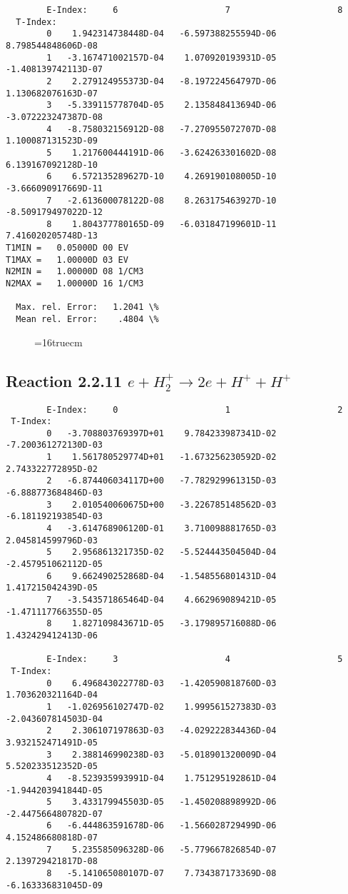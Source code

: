 \documentclass[12pt,dvipdfmx]{article}
\begin{document}
{\begin{small}
\begin{verbatim}
        E-Index:     6                     7                     8
  T-Index:
        0    1.942314738448D-04   -6.597388255594D-06    8.798544848606D-08
        1   -3.167471002157D-04    1.070920193931D-05   -1.408139742113D-07
        2    2.279124955373D-04   -8.197224564797D-06    1.130682076163D-07
        3   -5.339115778704D-05    2.135848413694D-06   -3.072223247387D-08
        4   -8.758032156912D-08   -7.270955072707D-08    1.100087131523D-09
        5    1.217600444191D-06   -3.624263301602D-08    6.139167092128D-10
        6    6.572135289627D-10    4.269190108005D-10   -3.666090917669D-11
        7   -2.613600078122D-08    8.263175463927D-10   -8.509179497022D-12
        8    1.804377780165D-09   -6.031847199601D-11    7.416020205748D-13
T1MIN =   0.05000D 00 EV
T1MAX =   1.00000D 03 EV
N2MIN =   1.00000D 08 1/CM3
N2MAX =   1.00000D 16 1/CM3

  Max. rel. Error:   1.2041 \%
  Mean rel. Error:    .4804 \%
\end{verbatim}\end{small}
\begin{figure} \label{2.2.10}
\epsfxsize=16truecm
\end{figure}
\newpage



\subsection{
Reaction 2.2.11   $e + H_2^+      \rightarrow 2e + H^+ + H^+ $
}


\begin{small}\begin{verbatim}
        E-Index:     0                     1                     2
 T-Index:
        0   -3.708803769397D+01    9.784233987341D-02   -7.200361272130D-03
        1    1.561780529774D+01   -1.673256230592D-02    2.743322772895D-02
        2   -6.874406034117D+00   -7.782929961315D-03   -6.888773684846D-03
        3    2.010540060675D+00   -3.226785148562D-03   -6.181192193854D-03
        4   -3.614768906120D-01    3.710098881765D-03    2.045814599796D-03
        5    2.956861321735D-02   -5.524443504504D-04   -2.457951062112D-05
        6    9.662490252868D-04   -1.548556801431D-04    1.417215042439D-05
        7   -3.543571865464D-04    4.662969089421D-05   -1.471117766355D-05
        8    1.827109843671D-05   -3.179895716088D-06    1.432429412413D-06

        E-Index:     3                     4                     5
 T-Index:
        0    6.496843022778D-03   -1.420590818760D-03    1.703620321164D-04
        1   -1.026956102747D-02    1.999561527383D-03   -2.043607814503D-04
        2    2.306107197863D-03   -4.029222834436D-04    3.932152471491D-05
        3    2.388146990238D-03   -5.018901320009D-04    5.520233512352D-05
        4   -8.523935993991D-04    1.751295192861D-04   -1.944203941844D-05
        5    3.433179945503D-05   -1.450208898992D-06   -2.447566480782D-07
        6   -6.444863591678D-06   -1.566028729499D-06    4.152486680818D-07
        7    5.235585096328D-06   -5.779667826854D-07    2.139729421817D-08
        8   -5.141065080107D-07    7.734387173369D-08   -6.163336831045D-09


\end{verbatim}
\end{small}}
\end{document}
